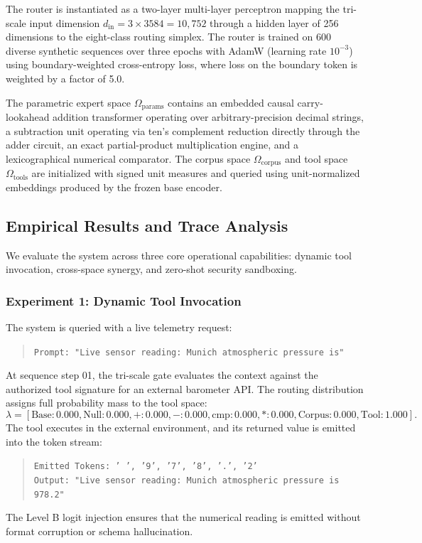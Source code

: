 \documentclass[preprint,12pt]{elsarticle}
\begin{document}
The router is instantiated as a two-layer multi-layer perceptron mapping the tri-scale input dimension $d_{\mathrm{in}} = 3 \times 3584 = 10{,}752$ through a hidden layer of 256 dimensions to the eight-class routing simplex. The router is trained on 600 diverse synthetic sequences over three epochs with AdamW (learning rate $10^{-3}$) using boundary-weighted cross-entropy loss, where loss on the boundary token is weighted by a factor of 5.0.

The parametric expert space $\Omega_{\mathrm{params}}$ contains an embedded causal carry-lookahead addition transformer operating over arbitrary-precision decimal strings, a subtraction unit operating via ten's complement reduction directly through the adder circuit, an exact partial-product multiplication engine, and a lexicographical numerical comparator. The corpus space $\Omega_{\mathrm{corpus}}$ and tool space $\Omega_{\mathrm{tools}}$ are initialized with signed unit measures and queried using unit-normalized embeddings produced by the frozen base encoder.

\subsection{Empirical Results and Trace Analysis}

We evaluate the system across three core operational capabilities: dynamic tool invocation, cross-space synergy, and zero-shot security sandboxing.

\subsubsection{Experiment 1: Dynamic Tool Invocation}
The system is queried with a live telemetry request:
\begin{quote}
\texttt{Prompt: "Live sensor reading: Munich atmospheric pressure is"}
\end{quote}
At sequence step 01, the tri-scale gate evaluates the context against the authorized tool signature for an external barometer API. The routing distribution assigns full probability mass to the tool space:
\begin{equation}
\lambda = [\text{Base}: 0.000, \text{Null}: 0.000, +: 0.000, -: 0.000, \text{cmp}: 0.000, *: 0.000, \text{Corpus}: 0.000, \text{Tool}: 1.000].
\end{equation}
The tool executes in the external environment, and its returned value is emitted into the token stream:
\begin{quote}
\texttt{Emitted Tokens: ' ', '9', '7', '8', '.', '2'} \\
\texttt{Output: "Live sensor reading: Munich atmospheric pressure is 978.2"}
\end{quote}
The Level B logit injection ensures that the numerical reading is emitted without format corruption or schema hallucination.
\end{document}

